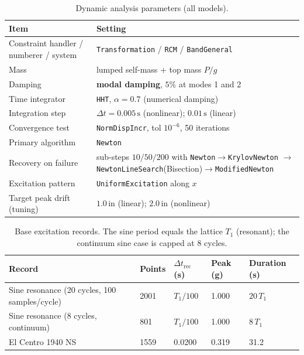 \documentclass[11pt]{article}
\newcommand{\unit}[1]{\,\mathrm{#1}}
\newcommand{\code}[1]{\texttt{#1}}
\begin{document}
\begin{table}[H]
\centering
\caption{Dynamic analysis parameters (all models).}
\begin{tabular}{>{\raggedright\arraybackslash}p{4.4cm} >{\raggedright\arraybackslash}p{10.8cm}}
\toprule
Item & Setting \\
\midrule
Constraint handler / numberer / system & \code{Transformation} / \code{RCM} / \code{BandGeneral} \\
Mass                 & lumped self-mass $+$ top mass $P/g$ \\
Damping              & \textbf{modal damping}, $5\%$ at modes 1 and 2 \\
Time integrator      & \code{HHT}, $\alpha=0.7$ (numerical damping) \\
Integration step     & $\Delta t = 0.005\unit{s}$ (nonlinear); $0.01\unit{s}$ (linear) \\
Convergence test     & \code{NormDispIncr}, tol $10^{-6}$, 50 iterations \\
Primary algorithm    & \code{Newton} \\
Recovery on failure  & sub-steps $10/50/200$ with \code{Newton}$\to$\code{KrylovNewton}
                       $\to$\code{NewtonLineSearch}(Bisection)$\to$\code{ModifiedNewton} \\
Excitation pattern   & \code{UniformExcitation} along $x$ \\
Target peak drift (tuning) & $1.0\unit{in}$ (linear); $2.0\unit{in}$ (nonlinear) \\
\bottomrule
\end{tabular}
\end{table}

\begin{table}[H]
\centering
\caption{Base excitation records. The sine period equals the lattice $T_1$ (resonant); the
continuum sine case is capped at 8 cycles.}
\begin{tabular}{l l l l l}
\toprule
Record & Points & $\Delta t_\mathrm{rec}$ (s) & Peak (g) & Duration (s) \\
\midrule
Sine resonance (20 cycles, 100 samples/cycle) & 2001 & $T_1/100$ & 1.000 & $20\,T_1$ \\
Sine resonance (8 cycles, continuum)          & 801  & $T_1/100$ & 1.000 & $8\,T_1$ \\
El Centro 1940 NS & 1559 & 0.0200 & 0.319 & 31.2 \\
\bottomrule
\end{tabular}
\end{table}
\end{document}
